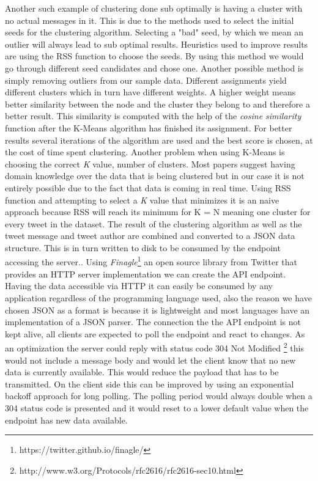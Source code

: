 \newline
Another such example of clustering done sub optimally is having a cluster with no actual messages in it. This is due to the methods used to select the initial seeds for the clustering algorithm. Selecting a "bad" seed, by which we mean an outlier will always lead to sub optimal results. Heuristics used to improve results are using the RSS function to choose the seeds. By using this method we would go through different seed candidates and chose one. Another possible method is simply removing outliers from our sample data.
\newline
Different assignments yield different clusters which in turn have different weights. A higher weight means better similarity between the node and the cluster they belong to and therefore a better result. This similarity is computed with the help of the \textit{cosine similarity} function after the K-Means algorithm has finished its assignment. For better results several iterations of the algorithm are used and the best score is chosen, at the cost of time spent clustering.
\newline
Another problem when using K-Means is choosing the correct \textit{K} value, number of clusters. Most papers suggest having domain knowledge over the data that is being clustered but in our case it is not entirely possible due to the fact that data is coming in real time. Using RSS function and attempting to select a \textit{K} value that minimizes it is an naive approach because RSS will reach its minimum for K = N meaning one cluster for every tweet in the dataset.
\newline
The result of the clustering algorithm as well as the tweet message and tweet author are combined and converted to a JSON data structure. This is in turn written to disk to be consumed by the endpoint accessing the server.. Using \textit{Finagle}\footnote{https://twitter.github.io/finagle/} an open source library from Twitter that provides an HTTP server implementation we can create the API endpoint.
\newline
Having the data accessible via HTTP it can easily be consumed by any application regardless of the programming language used, also the reason we have chosen JSON as a format is because it is lightweight and most languages have an implementation of a JSON parser. The connection the the API endpoint is not kept alive, all clients are expected to poll the endpoint and react to changes. As an optimization the server could reply with status code 304 Not Modified \footnote{http://www.w3.org/Protocols/rfc2616/rfc2616-sec10.html} this would not include a message body and would let the client know that no new data is currently available. This would reduce the payload that has to be transmitted. On the client side this can be improved by using an exponential backoff approach for long polling. The polling period would always double when a 304 status code is presented and it would reset to a lower default value when the endpoint has new data available.

